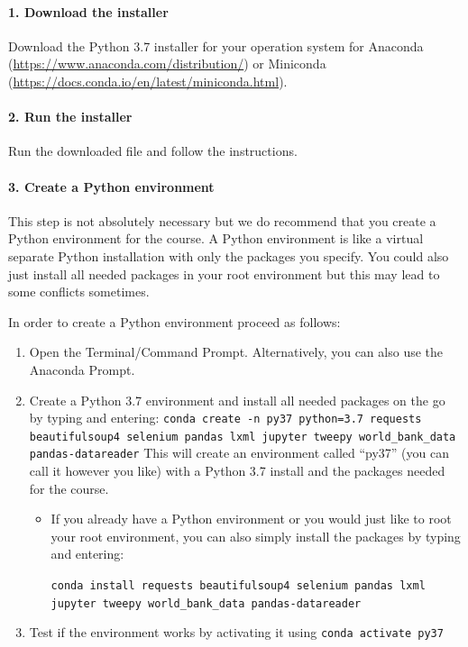 \documentclass[a4paper]{article}
\begin{document}
\paragraph{1. Download the installer} Download the Python 3.7 installer for your operation system for Anaconda (\url{https://www.anaconda.com/distribution/}) or Miniconda (\url{https://docs.conda.io/en/latest/miniconda.html}).

\paragraph{2. Run the installer} Run the downloaded file and follow the instructions.

\paragraph{3. Create a Python environment} This step is not absolutely necessary but we do recommend that you create a Python environment for the course. A Python environment is like a virtual separate Python installation with only the packages you specify. You could also just install all needed packages in your root environment but this may lead to some conflicts sometimes.

In order to create a Python environment proceed as follows:
\begin{enumerate}
	\item Open the Terminal/Command Prompt. Alternatively, you can also use the Anaconda Prompt.
	\item Create a Python 3.7 environment and install all needed packages on the go by typing and entering: \verb!conda create -n py37 python=3.7 requests beautifulsoup4 selenium pandas lxml jupyter tweepy world_bank_data pandas-datareader! This will create an environment called ``py37'' (you can call it however you like) with a Python 3.7 install and the packages needed for the course.
	\begin{itemize}
		\item If you already have a Python environment or you would just like to root your root environment, you can also simply install the packages by typing and entering:

		\verb!conda install requests beautifulsoup4 selenium pandas lxml jupyter tweepy world_bank_data pandas-datareader!
	\end{itemize}
	\item Test if the environment works by activating it using \verb!conda activate py37!
\end{enumerate}
\end{document}
